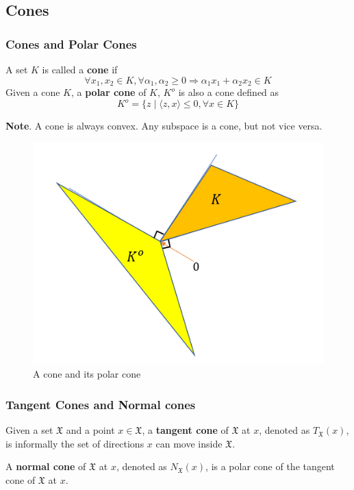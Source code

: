 \subsection{Cones}
\begin{frame}\frametitle{Cones and Polar Cones}
    \begin{definition}
        A set $K$ is called a \textbf{cone} if
        \begin{equation*}
            \forall x_1, x_2 \in K, \forall \alpha_1, \alpha_2 \geq 0 \Rightarrow \alpha_1 x_1 + \alpha_2 x_2 \in K
        \end{equation*}
        Given a cone $K$, a \textbf{polar cone} of $K$, $K^{o}$ is also a cone defined as
        \begin{equation*}
            K^{o} = \{z \mid \langle z, x \rangle \leq 0, \forall x \in K\}
        \end{equation*}
    \end{definition}

    \textbf{Note}. A cone is always convex. Any subspace is a cone, but not vice versa.

    \begin{figure}
    \includegraphics[scale=0.25]{./figures/cone_polarcone.png}
    \caption{A cone and its polar cone}
    \end{figure}
\end{frame}

\begin{frame}\frametitle{Tangent Cones and Normal cones}
    \begin{definition}
        Given a set $\mathfrak{X}$ and a point $x \in \mathfrak{X}$, a \textbf{tangent cone} of $\mathfrak{X}$ at $x$, denoted as $T_\mathfrak{X}(x)$,
        is informally the set of directions $x$ can move inside $\mathfrak{X}$.
    \end{definition}

    \begin{definition}
        A \textbf{normal cone} of $\mathfrak{X}$ at $x$, denoted as $N_\mathfrak{X}(x)$, is a polar cone of the tangent cone of $\mathfrak{X}$ at $x$.
    \end{definition}


\end{frame}

